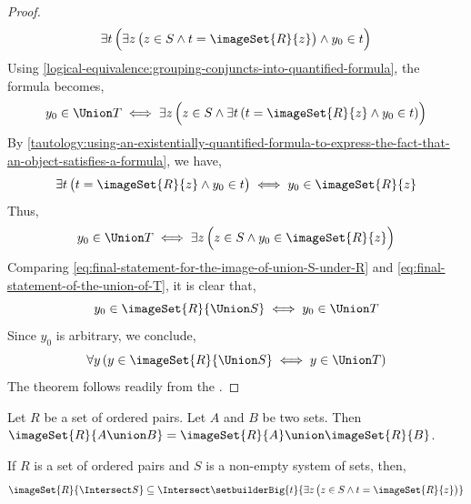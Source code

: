 \begin{proof}
\begin{equation*}
        \exists t \, \Big( \exists z \, \big( z \in S \land t = \imageSet{R}{z} \big) \land y_{0} \in t \Big)
    \end{equation*}
    Using \cref{logical-equivalence:grouping-conjuncts-into-quantified-formula}, the formula becomes,
    \begin{equation*}
        y_{0} \in \Union T
        \iff
        \exists z \, \Big( z \in S \land \exists t \, \mleft( t = \imageSet{R}{z} \land y_{0} \in t \mright) \Big)
    \end{equation*}
    By \cref{tautology:using-an-existentially-quantified-formula-to-express-the-fact-that-an-object-satisfies-a-formula}, we have,
    \begin{equation*}
        \exists t \, \big( t = \imageSet{R}{z} \land y_{0} \in t \big)
        \iff
        y_{0} \in \imageSet{R}{z}
    \end{equation*}
    Thus,
    \begin{equation}
        \label{eq:final-statement-of-the-union-of-T}
        y_{0} \in \Union T
        \iff
        \exists z \, \Big( z \in S \land y_{0} \in \imageSet{R}{z} \Big)
    \end{equation}
    Comparing \eqref{eq:final-statement-for-the-image-of-union-S-under-R} and \eqref{eq:final-statement-of-the-union-of-T},
    it is clear that,
    \begin{equation*}
        y_{0} \in \imageSet{R}{\Union S} \iff y_{0} \in \Union T
    \end{equation*}
    Since \( y_{0} \) is arbitrary, we conclude,
    \begin{equation*}
        \forall y \, \mleft( y \in \imageSet{R}{\Union S} \iff y \in \Union T \mright)
    \end{equation*}
    The theorem follows readily from the .
\end{proof}

\begin{cor}
    \label{thm:image-of-A-union-B-under-R-is-the-union-of-the-image-of-A-under-R-and-the-image-of-B-under-R}
    Let \( R \) be a set of ordered pairs. Let \( A \) and \( B \) be two sets.
    Then \( \imageSet{R}{A \union B} = \imageSet{R}{A} \union \imageSet{R}{B} \).
\end{cor}

\begin{thm}
    \label{thm:image-of-an-intersection-is-a-subset-of-the-intersection-of-all-individual-images}
    If \( R \) is a set of ordered pairs and \( S \) is a non-empty system of sets, then,
    \begin{equation*}
        \imageSet{R}{\Intersect S} \subseteq \Intersect \setbuilderBig{t}{\exists z \, \big( z \in S \land t = \imageSet{R}{z} \big)}
    \end{equation*}
\end{thm}

